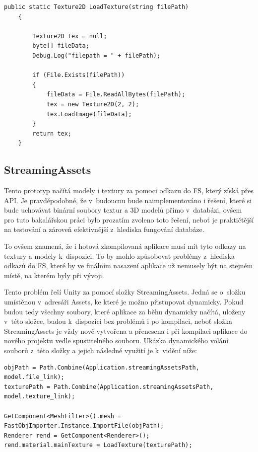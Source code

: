 \documentclass[thesis=B,czech]{FITthesis}[2012/06/26]
\begin{document}
\begin{lstlisting}[frame=single]
  public static Texture2D LoadTexture(string filePath)
    {

        Texture2D tex = null;
        byte[] fileData;
        Debug.Log("filepath = " + filePath);

        if (File.Exists(filePath))
        {
            fileData = File.ReadAllBytes(filePath);
            tex = new Texture2D(2, 2);
            tex.LoadImage(fileData);
        }
        return tex;
    }
        \end{lstlisting}	
        
        
    \subsection{StreamingAssets}
Tento prototyp načítá modely i textury za pomoci odkazu do FS, který získá přes API. Je pravděpodobné, že v~budoucnu bude naimplementováno i řešení, které si bude uchovávat binární soubory textur a 3D modelů přímo v~databázi, ovšem pro tuto bakalářskou práci bylo prozatím zvoleno toto řešení, neboť je praktičtější na testování a zároveň efektivnější z~hlediska fungování databáze.

To ovšem znamená, že i hotová zkompilovaná aplikace musí mít tyto odkazy na textury a modely k~dispozici. To by mohlo způsobovat problémy z~hlediska odkazů do FS, které by ve finálním nasazení aplikace už nemusely být na stejném místě, na kterém byly při vývoji.

Tento problém řeší Unity za pomocí složky StreamingAssets. Jedná se o~složku umístěnou v~adresáři Assets, ke které je možno přistupovat dynamicky. Pokud budou tedy všechny soubory, které aplikace za běhu dynamicky načítá, uloženy v~této složce, budou k~dispozici bez problémů i po kompilaci, neboť složka StreamingAssets je vždy nově vytvořena a přenesena i při kompilaci aplikace do nového projektu vedle spustitelného souboru. Ukázka dynamického volání souborů z~této složky a jejich následné využití je k~vidění níže:

\begin{lstlisting}[frame=single]
objPath = Path.Combine(Application.streamingAssetsPath, model.file_link);
texturePath = Path.Combine(Application.streamingAssetsPath, model.texture_link);

GetComponent<MeshFilter>().mesh = FastObjImporter.Instance.ImportFile(objPath);
Renderer rend = GetComponent<Renderer>();
rend.material.mainTexture = LoadTexture(texturePath);
\end{lstlisting}
\end{document}

